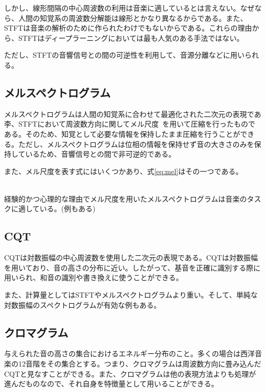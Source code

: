 しかし、線形間隔の中心周波数の利用は音楽に適しているとは言えない。なぜなら、人間の知覚系の周波数分解能は線形とかなり異なるからである。また、STFTは音楽の解析のために作られたわけでもないからである。これらの理由から、STFTはディープラーニングにおいては最も人気のある手法ではない。

ただし、STFTの音響信号との間の可逆性を利用して、音源分離などに用いられる。

\subsection{メルスペクトログラム}

メルスペクトログラムは人間の知覚系に合わせて最適化された二次元の表現であ李、STFTにおいて周波数方向に関してメル尺度~\cite{melscale}を用いて圧縮を行ったものである。そのため、知覚として必要な情報を保持したまま圧縮を行うことができる。ただし、メルスペクトログラムは位相の情報を保持せず音の大きさのみを保持しているため、音響信号との間で非可逆的である。

また、メル尺度を表す式にはいくつかあり、式\ref{eq:mel}はその一つである。

\begin{align}
    \label{eq:mel}
\end{align}

経験的かつ心理的な理由でメル尺度を用いたメルスペクトログラムは音楽のタスクに適している。(例もある)

\subsection{CQT}

CQTは対数振幅の中心周波数を使用した二次元の表現である。CQTは対数振幅を用いており、音の高さの分布に近い。したがって、基音を正確に識別する際に用いられ、和音の識別や書き換えに使うことができる。

また、計算量としてはSTFTやメルスペクトログラムより重い。そして、単純な対数振幅のスペクトログラムが有効な例もある。

\subsection{クロマグラム}

与えられた音の高さの集合におけるエネルギー分布のこと。多くの場合は西洋音楽の12音階をその集合とする。つまり、クロマグラムは周波数方向に畳み込んだCQTと見なすことができる。また、クロマグラムは他の表現方法よりも処理が進んだものなので、それ自身を特徴量として用いることができる。


